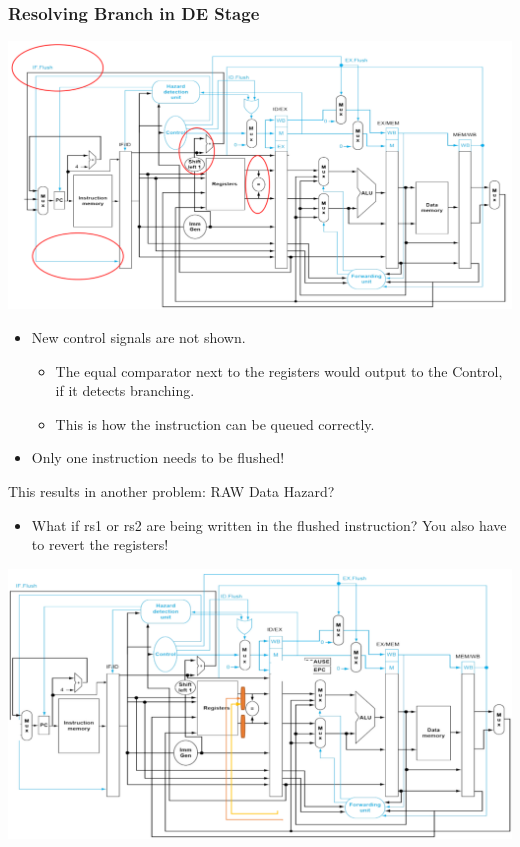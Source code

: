 \documentclass[10pt]{article}
\begin{document}
\subsubsection*{Resolving Branch in DE Stage}
\begin{center}
    \includegraphics*[scale=0.4]{W3_19.png}
\end{center}
\begin{itemize}
    \item New control signals are not shown.
    \begin{itemize}
        \item The equal comparator next to the registers would output to the Control, if it detects branching.
        \item This is how the instruction can be queued correctly.
    \end{itemize}
    \item Only one instruction needs to be flushed!
\end{itemize}
This results in another problem: RAW Data Hazard?
\begin{itemize}
    \item What if rs1 or rs2 are being written in the flushed instruction?  You also have to revert the registers!
\end{itemize}
\begin{center}
    \includegraphics*[scale=0.6]{W3_20.png}
\end{center}
\end{document}
